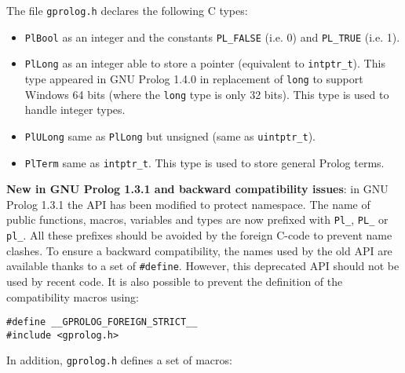 
The file \texttt{gprolog.h} declares the following C types:

\begin{itemize}

\item \texttt{PlBool} as an integer and the constants \texttt{PL\_FALSE} (i.e. 0) and \texttt{PL\_TRUE}
(i.e. 1).

\item \texttt{PlLong} as an integer able to store a pointer (equivalent to
  \texttt{intptr\_t}). This type appeared in GNU Prolog 1.4.0 in replacement
  of \texttt{long} to support Windows 64 bits (where the \texttt{long} type is only
  32 bits). This type is used to handle integer types.

\item \texttt{PlULong} same as \texttt{PlLong} but unsigned (same as \texttt{uintptr\_t}).

\item \texttt{PlTerm} same as \texttt{intptr\_t}. This type is used to store general Prolog terms.

\end{itemize}


\textbf{New in GNU Prolog 1.3.1 and backward compatibility issues}: in
GNU Prolog 1.3.1 the API has been modified to protect namespace. The name of
public functions, macros, variables and types are now prefixed
with \texttt{Pl\_}, \texttt{PL\_} or \texttt{pl\_}. All these prefixes should
be avoided by the foreign C-code to prevent name clashes. To ensure a
backward compatibility, the names used by the old API are available thanks to
a set of \texttt{\#define}. However, this deprecated API should not be used
by recent code. It is also possible to prevent the definition of the
compatibility macros using:

\begin{Indentation}
\begin{verbatim}
#define __GPROLOG_FOREIGN_STRICT__
#include <gprolog.h>
\end{verbatim}
\end{Indentation}

In addition, \texttt{gprolog.h} defines a set of macros:

